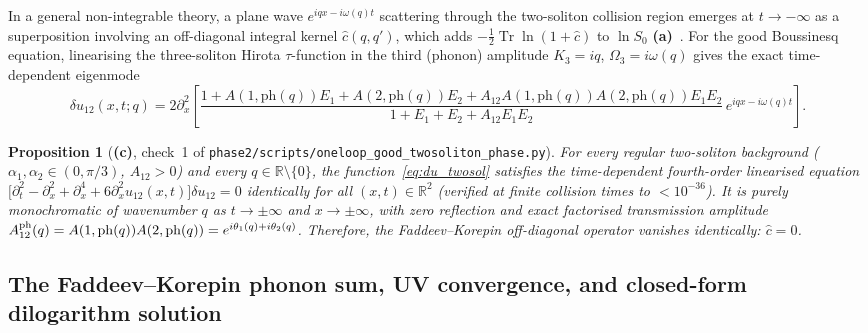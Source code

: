 \documentclass[11pt,a4paper]{article}
\newcommand{\La}{\textsf{\textbf{(a)}}}
\newcommand{\Lc}{\textsf{\textbf{(c)}}}
\newcommand{\script}[1]{\texttt{phase2/\allowbreak scripts/\allowbreak #1}}
\newtheorem{proposition}{Proposition}[section]
\theoremstyle{remark}
\begin{document}
In a general non-integrable theory, a plane wave $e^{iqx-i\omega(q)t}$ scattering through the two-soliton collision region emerges at $t\to-\infty$ as a superposition involving an off-diagonal integral kernel $\hat{c}(q,q')$, which adds $-\tfrac12\operatorname{Tr}\ln(1+\hat{c})$ to $\ln S_0$ \La~\cite{FK78}. For the good Boussinesq equation, linearising the three-soliton Hirota $\tau$-function in the third (phonon) amplitude $K_3=iq$, $\Omega_3=i\omega(q)$ gives the exact time-dependent eigenmode
\begin{equation}\label{eq:du_twosol}
\delta u_{12}(x,t;q)=2\partial_x^2\left[\frac{1+A(1,\mathrm{ph}(q))E_1+A(2,\mathrm{ph}(q))E_2+A_{12}A(1,\mathrm{ph}(q))A(2,\mathrm{ph}(q))E_1 E_2}{1+E_1+E_2+A_{12}E_1 E_2}\,e^{iqx-i\omega(q)t}\right].
\end{equation}

\begin{proposition}[\Lc, check~1 of \script{oneloop\_good\_twosoliton\_phase.py}]\label{prop:twosol_modes}
For every regular two-soliton background ($\alpha_1,\alpha_2\in(0,\pi/3)$, $A_{12}>0$) and every $q\in\mathbb{R}\setminus\{0\}$, the function~\eqref{eq:du_twosol} satisfies the time-dependent fourth-order linearised equation $\big[\partial_t^2-\partial_x^2+\partial_x^4+6\partial_x^2 u_{12}(x,t)\big]\delta u_{12}=0$ identically for all $(x,t)\in\mathbb{R}^2$ (verified at finite collision times to $<10^{-36}$). It is purely monochromatic of wavenumber $q$ as $t\to\pm\infty$ and $x\to\pm\infty$, with zero reflection and exact factorised transmission amplitude $A_{12}^{\rm ph}(q)=A(1,\mathrm{ph}(q))A(2,\mathrm{ph}(q))=e^{i\theta_1(q)+i\theta_2(q)}$. Therefore, the Faddeev--Korepin off-diagonal operator vanishes identically: $\hat{c}=0$.
\end{proposition}

\subsection{The Faddeev--Korepin phonon sum, UV convergence, and closed-form dilogarithm solution}
\end{document}
